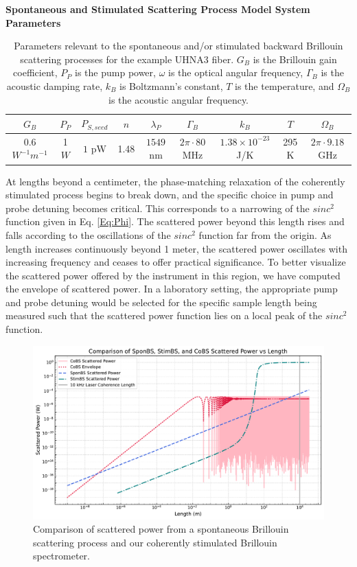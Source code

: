 \begin{table}[ht]
  \centering
  \textbf{Spontaneous and Stimulated Scattering Process Model System Parameters}
  \renewcommand{\arraystretch}{1.2}
  \begin{tabular}{|c|c|c|c|c|c|c|c|c|}
    \hline
    $G_{B}$ & $P_{P}$ & $P_{S,seed}$ & $n$ & $\lambda_P$ & $\Gamma_{B}$ & $k_{B}$ & $T$ & $\Omega_{B}$ \\
    \hline
    0.6 $W^{-1} m^{-1}$ & 1 $W$ & $1$ pW & 1.48 & $1549$ nm & $2\pi \cdot 80$ MHz & $1.38 \times 10^{-23}$ J/K & 295 K & $2\pi \cdot 9.18$ GHz \\
    \hline
  \end{tabular}
  \caption{Parameters relevant to the spontaneous and/or stimulated backward Brillouin scattering processes for the example UHNA3 fiber. $G_{B}$ is the Brillouin gain coefficient, $P_{P}$ is the pump power, $\omega$ is the optical angular frequency, $\Gamma_{B}$ is the acoustic damping rate, $k_{B}$ is Boltzmann's constant, $T$ is the temperature, and $\Omega_{B}$ is the acoustic angular frequency.}
  \label{tab:SBS Parameters}
\end{table}

At lengths beyond a centimeter, the phase-matching relaxation of the coherently stimulated process begins to break down, and the specific choice in pump and probe detuning becomes critical. This corresponds to a narrowing of the $sinc^{2}$ function given in Eq. \ref{Eq:Phi}. The scattered power beyond this length rises and falls according to the oscillations of the $sinc^{2}$ function far from the origin. As length increases continuously beyond 1 meter, the scattered power oscillates with increasing frequency and ceases to offer practical significance. To better visualize the scattered power offered by the instrument in this region, we have computed the envelope of scattered power. In a laboratory setting, the appropriate pump and probe detuning would be selected for the specific sample length being measured such that the scattered power function lies on a local peak of the $sinc^{2}$ function.

\begin{figure}[ht]
\centering
\includegraphics[width=\textwidth]{figs/4-CABS/SponBSvsStimBSvsCoBS.pdf}
\caption{Comparison of scattered power from a spontaneous Brillouin scattering process and our coherently stimulated Brillouin spectrometer.}
\label{fig:SponBSvsStimBSvsCoBS}
\end{figure}

